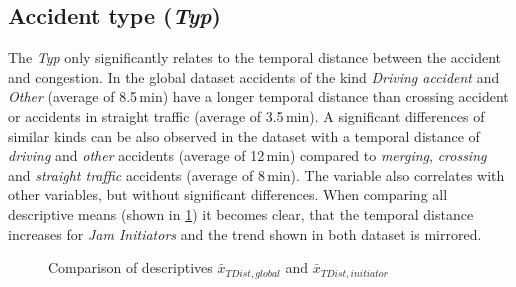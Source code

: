 \subsection{Accident type (\textit{Typ})}
\label{analysis_sum_Typ}
The \textit{Typ} only significantly relates to the temporal distance between the accident and congestion. In the global dataset accidents of the kind \textit{Driving accident} and \textit{Other} (average of 8.5\,min) have a longer temporal distance than crossing accident or accidents in straight traffic (average of 3.5\,min). A significant differences of similar kinds can be also observed in the  dataset with a temporal distance of \textit{driving} and \textit{other} accidents (average of 12\,min) compared to \textit{merging}, \textit{crossing} and \textit{straight traffic} accidents (average of 8\,min). The variable also correlates with other variables, but without significant differences. When comparing all descriptive means (shown in \cref{fig:baysis_summary_Typ_TDist_barplot}) it becomes clear, that the temporal distance increases for \textit{Jam Initiators}
and the trend shown in both dataset is mirrored.
\begin{figure}[ht!]
    \data
    \pgfplotstablesort[sort key=means, sort cmp=float >]{\datasorted}{\data}
    \tiny
    \centering
    \caption{Comparison of descriptives $\bar{x}_{TDist,global}$ and $\bar{x}_{TDist,initiator}$}
    \label{fig:baysis_summary_Typ_TDist_barplot}
\end{figure}

